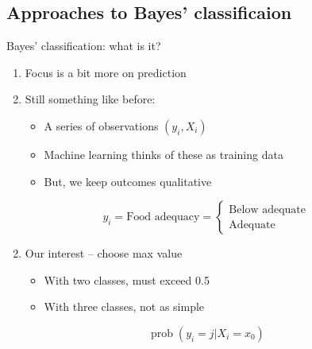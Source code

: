 \documentclass[
  ignorenonframetext,
]{beamer}
\providecommand{\tightlist}{%
  \setlength{\itemsep}{0pt}\setlength{\parskip}{0pt}}
\DeclareMathOperator{\prob}{prob}
\begin{document}
\subsection{Approaches to Bayes'
classificaion}\label{approaches-to-bayes-classificaion}

\begin{frame}{Bayes' classification: what is it?}
\protect{}\label{bayes-classification-what-is-it}
\begin{enumerate}
\tightlist
\item
  Focus is a bit more on prediction
\item
  Still something like before:

  \begin{itemize}
  \tightlist
  \item
    A series of observations \((y_i,X_i)\)
  \item
    Machine learning thinks of these as training data
  \item
    But, we keep outcomes qualitative
  \end{itemize}
\end{enumerate}

\[
y_i =  \text{Food adequacy} = \begin{cases}
\text{Below adequate} \\
\text{Adequate}
\end{cases}
\]

\begin{enumerate}
\setcounter{enumi}{1}
\tightlist
\item
  Our interest -- choose max value

  \begin{itemize}
  \tightlist
  \item
    With two classes, must exceed 0.5
  \item
    With three classes, not as simple
  \end{itemize}
\end{enumerate}

\[
\prob(y_i = j | X_i = x_0)
\]
\end{frame}
\end{document}
